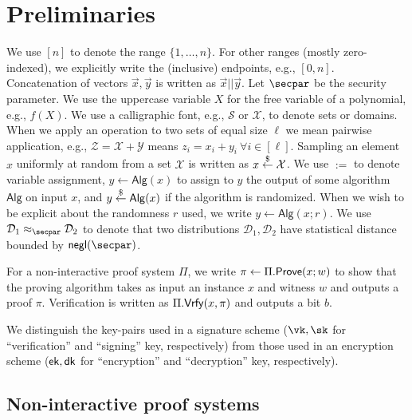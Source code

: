 \section{Preliminaries}\label{sec:prelims}

We use $[n]$ to denote the range $\{1, \dots, n\}$. For other ranges (mostly zero-indexed), we explicitly write the (inclusive) endpoints, e.g., $[0,n]$. 
Concatenation of vectors $\vec{x},\vec{y}$ is written as $\vec{x} || \vec{y}$. 
Let $\secpar$ be the security parameter.
We use the uppercase variable $X$ for the free variable of a polynomial, e.g., $f(X)$. 
We use a calligraphic font, e.g., $\mathcal{S}$ or $\mathcal{X}$, to denote sets or domains. When we apply an operation to two sets of equal size $\ell$ we mean pairwise application, e.g., $\mathcal{Z} = \mathcal{X} + \mathcal{Y}$ means $z_i = x_i + y_i~\forall{i \in [\ell]}$. 
Sampling an element $x$ uniformly at random from a set $\mathcal{X}$ is written as $x \stackrel{\$}{\gets} \mathcal{X}$. 
We use $:=$ to denote variable assignment, $y \gets \mathsf{Alg}(x)$ to assign to $y$ the output of some algorithm $\mathsf{Alg}$ on input $x$, and $y \stackrel{\$}{\gets} \mathsf{Alg}(x)$ if the algorithm is randomized. When we wish to be explicit about the randomness $r$ used, we write $y \gets \mathsf{Alg}(x; r)$. We use $\mathcal{D}_1 \approx_\secpar \mathcal{D}_2$ to denote that two distributions $\mathcal{D}_1, \mathcal{D}_2$ have statistical distance bounded by $\negl$.

For a non-interactive proof system $\Pi$, we write $\pi \gets \Pi.\mathsf{Prove}(x; w)$ to show that the proving algorithm takes as input an instance $x$ and witness $w$ and outputs a proof $\pi$. Verification is written as $\Pi.\mathsf{Vrfy}(x, \pi)$ and outputs a bit $b$. 

We distinguish the key-pairs used in a signature scheme ($\vk, \sk$ for ``verification'' and ``signing'' key, respectively) from those used in an encryption scheme ($\mathsf{ek}, \mathsf{dk}$ for ``encryption'' and ``decryption'' key, respectively). 

\subsection{Non-interactive proof systems}\label{sec:nizks}

